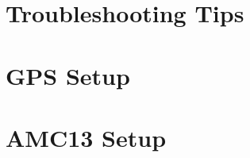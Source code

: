 \documentclass[11pt]{article}
\begin{document}


\section{Troubleshooting Tips}



\appendix

\section{GPS Setup}



\section{AMC13 Setup}


\end{document}

